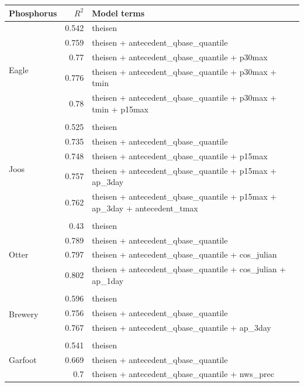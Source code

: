 \documentclass[10pt]{article}
\begin{document}
\begin{table}[h] \small
    \begin{center}
    \begin{tabular}{lrl}
    \textbf{Phosphorus} & $R^2$ & Model terms \\
    \hline
\multirow{6}{*}{Eagle} & 0.542 & theisen\\ 
 & 0.759 & theisen + antecedent\_qbase\_quantile\\ 
 & 0.77 & theisen + antecedent\_qbase\_quantile + p30max\\ 
 & 0.776 & theisen + antecedent\_qbase\_quantile + p30max + tmin\\ 
 & 0.78 & theisen + antecedent\_qbase\_quantile + p30max + tmin + p15max\\ 
\vspace{2mm}\\ \multirow{6}{*}{Joos} & 0.525 & theisen\\ 
 & 0.735 & theisen + antecedent\_qbase\_quantile\\ 
 & 0.748 & theisen + antecedent\_qbase\_quantile + p15max\\ 
 & 0.757 & theisen + antecedent\_qbase\_quantile + p15max + ap\_3day\\ 
 & 0.762 & theisen + antecedent\_qbase\_quantile + p15max + ap\_3day + antecedent\_tmax\\ 
\vspace{2mm}\\ \multirow{5}{*}{Otter} & 0.43 & theisen\\ 
 & 0.789 & theisen + antecedent\_qbase\_quantile\\ 
 & 0.797 & theisen + antecedent\_qbase\_quantile + cos\_julian\\ 
 & 0.802 & theisen + antecedent\_qbase\_quantile + cos\_julian + ap\_1day\\ 
\vspace{2mm}\\ \multirow{4}{*}{Brewery} & 0.596 & theisen\\ 
 & 0.756 & theisen + antecedent\_qbase\_quantile\\ 
 & 0.767 & theisen + antecedent\_qbase\_quantile + ap\_3day\\ 
\vspace{2mm}\\ \multirow{5}{*}{Garfoot} & 0.541 & theisen\\ 
 & 0.669 & theisen + antecedent\_qbase\_quantile\\ 
 & 0.7 & theisen + antecedent\_qbase\_quantile + nws\_prec\\ 

\end{tabular}
\end{center}
\end{table}
\end{document}
